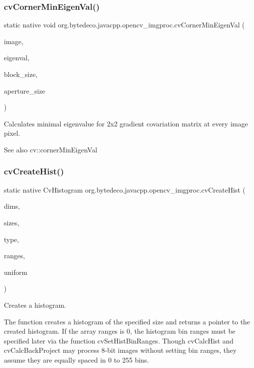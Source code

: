 \subsubsection{\texorpdfstring{cv\+Corner\+Min\+Eigen\+Val()}{cvCornerMinEigenVal()}}
{\footnotesize\ttfamily static native void org.\+bytedeco.\+javacpp.\+opencv\+\_\+imgproc.\+cv\+Corner\+Min\+Eigen\+Val (\begin{DoxyParamCaption}\item[{@Const Cv\+Arr}]{image,  }\item[{Cv\+Arr}]{eigenval,  }\item[{int}]{block\+\_\+size,  }\item[{int}]{aperture\+\_\+size }\end{DoxyParamCaption})\hspace{0.3cm}{\ttfamily [static]}}



Calculates minimal eigenvalue for 2x2 gradient covariation matrix at every image pixel. 

\begin{DoxySeeAlso}{See also}
cv\+::corner\+Min\+Eigen\+Val 
\end{DoxySeeAlso}
\mbox{\label{group__imgproc__c_ga35e0a34e834d2b6654992a0116be5253}} 
\subsubsection{\texorpdfstring{cv\+Create\+Hist()}{cvCreateHist()}}
{\footnotesize\ttfamily static native Cv\+Histogram org.\+bytedeco.\+javacpp.\+opencv\+\_\+imgproc.\+cv\+Create\+Hist (\begin{DoxyParamCaption}\item[{int}]{dims,  }\item[{Int\+Pointer}]{sizes,  }\item[{int}]{type,  }\item[{@Cast(\char`\"{}float$\ast$$\ast$\char`\"{}) Pointer\+Pointer}]{ranges,  }\item[{int}]{uniform }\end{DoxyParamCaption})\hspace{0.3cm}{\ttfamily [static]}}



Creates a histogram. 

The function creates a histogram of the specified size and returns a pointer to the created histogram. If the array ranges is 0, the histogram bin ranges must be specified later via the function cv\+Set\+Hist\+Bin\+Ranges. Though cv\+Calc\+Hist and cv\+Calc\+Back\+Project may process 8-\/bit images without setting bin ranges, they assume they are equally spaced in 0 to 255 bins. 


